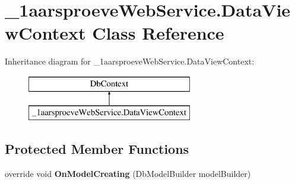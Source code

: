\hypertarget{class__1aarsproeve_web_service_1_1_data_view_context}{}\section{\+\_\+1aarsproeve\+Web\+Service.\+Data\+View\+Context Class Reference}
\label{class__1aarsproeve_web_service_1_1_data_view_context}
Inheritance diagram for \+\_\+1aarsproeve\+Web\+Service.\+Data\+View\+Context\+:\begin{figure}[H]
\begin{center}
\leavevmode
\includegraphics[height=2.000000cm]{class__1aarsproeve_web_service_1_1_data_view_context}
\end{center}
\end{figure}
\subsection*{Protected Member Functions}
\begin{DoxyCompactItemize}
\item 
\hypertarget{class__1aarsproeve_web_service_1_1_data_view_context_a419cff00a22f39825d2a46495b72027d}{}override void {\bfseries On\+Model\+Creating} (Db\+Model\+Builder model\+Builder)\label{class__1aarsproeve_web_service_1_1_data_view_context_a419cff00a22f39825d2a46495b72027d}

\end{DoxyCompactItemize}
